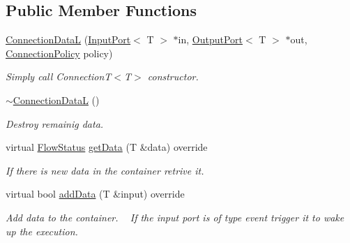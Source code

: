 \subsection*{Public Member Functions}
\begin{DoxyCompactItemize}
\item 
\hypertarget{classcoco_1_1_connection_data_l_a2e4d4feb75319345f32f2355456105b0}{}\hyperlink{classcoco_1_1_connection_data_l_a2e4d4feb75319345f32f2355456105b0}{Connection\+Data\+L} (\hyperlink{classcoco_1_1_input_port}{Input\+Port}$<$ T $>$ $\ast$in, \hyperlink{classcoco_1_1_output_port}{Output\+Port}$<$ T $>$ $\ast$out, \hyperlink{structcoco_1_1_connection_policy}{Connection\+Policy} policy)\label{classcoco_1_1_connection_data_l_a2e4d4feb75319345f32f2355456105b0}

\begin{DoxyCompactList}\small\item\em Simply call Connection\+T$<$\+T$>$ constructor. \end{DoxyCompactList}\item 
\hypertarget{classcoco_1_1_connection_data_l_a18d1f8d55a4e5bfec1c028c22da25022}{}\hyperlink{classcoco_1_1_connection_data_l_a18d1f8d55a4e5bfec1c028c22da25022}{$\sim$\+Connection\+Data\+L} ()\label{classcoco_1_1_connection_data_l_a18d1f8d55a4e5bfec1c028c22da25022}

\begin{DoxyCompactList}\small\item\em Destroy remainig data. \end{DoxyCompactList}\item 
\hypertarget{classcoco_1_1_connection_data_l_a182d9bc170db89f0ed0b4b74abf8e107}{}virtual \hyperlink{namespacecoco_a057be58377e415c9be98c1dc5c8426ad}{Flow\+Status} \hyperlink{classcoco_1_1_connection_data_l_a182d9bc170db89f0ed0b4b74abf8e107}{get\+Data} (T \&data) override\label{classcoco_1_1_connection_data_l_a182d9bc170db89f0ed0b4b74abf8e107}

\begin{DoxyCompactList}\small\item\em If there is new data in the container retrive it. \end{DoxyCompactList}\item 
\hypertarget{classcoco_1_1_connection_data_l_a9c934c06e92dcc6e4442b6ab68b845b7}{}virtual bool \hyperlink{classcoco_1_1_connection_data_l_a9c934c06e92dcc6e4442b6ab68b845b7}{add\+Data} (T \&input) override\label{classcoco_1_1_connection_data_l_a9c934c06e92dcc6e4442b6ab68b845b7}

\begin{DoxyCompactList}\small\item\em Add data to the container. ~\newline
 If the input port is of type event trigger it to wake up the execution. \end{DoxyCompactList}\end{DoxyCompactItemize}
